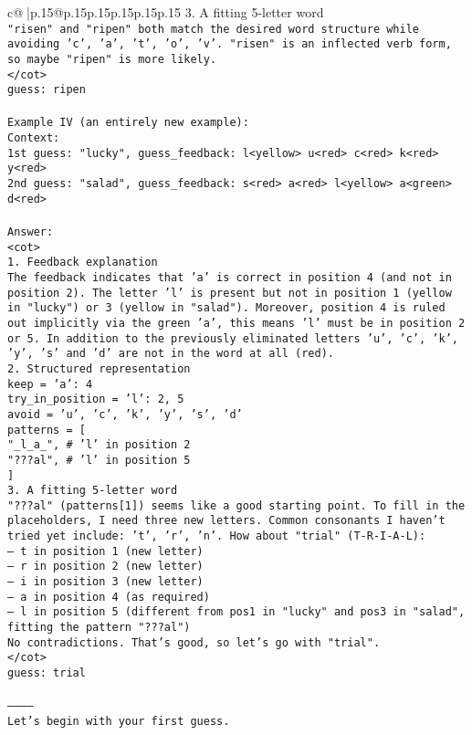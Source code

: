 \documentclass{article}
\begin{document}
{\begin{supertabular}{c@{$\;$}|p{.15\linewidth}@{}p{.15\linewidth}p{.15\linewidth}p{.15\linewidth}p{.15\linewidth}p{.15\linewidth}}
{{{3. A fitting 5-letter word\\ \tt "risen" and "ripen" both match the desired word structure while avoiding {'c', 'a', 't', 'o', 'v'}. "risen" is an inflected verb form, so maybe "ripen" is more likely.\\ \tt </cot>\\ \tt guess: ripen\\ \tt \\ \tt Example IV (an entirely new example):\\ \tt Context:\\ \tt 1st guess: "lucky", guess_feedback: l<yellow> u<red> c<red> k<red> y<red>\\ \tt 2nd guess: "salad", guess_feedback: s<red> a<red> l<yellow> a<green> d<red>\\ \tt \\ \tt Answer:\\ \tt <cot>\\ \tt 1. Feedback explanation\\ \tt The feedback indicates that 'a' is correct in position 4 (and not in position 2). The letter 'l' is present but not in position 1 (yellow in "lucky") or 3 (yellow in "salad"). Moreover, position 4 is ruled out implicitly via the green 'a', this means 'l' must be in position 2 or 5. In addition to the previously eliminated letters {'u', 'c', 'k', 'y'}, 's' and 'd' are not in the word at all (red).\\ \tt 2. Structured representation\\ \tt keep = {'a': 4}\\ \tt try_in_position = {'l': {2, 5}}\\ \tt avoid = {'u', 'c', 'k', 'y', 's', 'd'}\\ \tt patterns = [\\ \tt     "_l_a_",  # 'l' in position 2\\ \tt     "???al",  # 'l' in position 5\\ \tt ]\\ \tt 3. A fitting 5-letter word\\ \tt "???al" (patterns[1]) seems like a good starting point. To fill in the placeholders, I need three new letters. Common consonants I haven't tried yet include: 't', 'r', 'n'. How about "trial" (T-R-I-A-L):\\ \tt — t in position 1 (new letter)\\ \tt — r in position 2 (new letter)\\ \tt — i in position 3 (new letter)\\ \tt — a in position 4 (as required)\\ \tt — l in position 5 (different from pos1 in "lucky" and pos3 in "salad", fitting the pattern "???al")\\ \tt No contradictions. That's good, so let's go with "trial".\\ \tt </cot>\\ \tt guess: trial\\ \tt \\ \tt -----------\\ \tt Let's begin with your first guess. 
}}}
\end{supertabular}}
\end{document}
